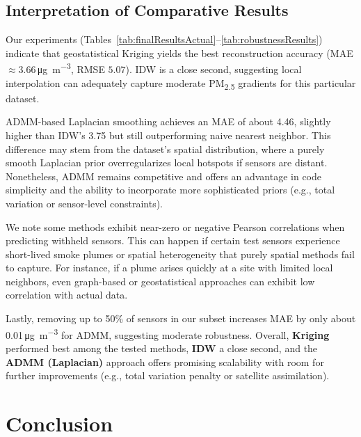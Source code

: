 \documentclass[12pt]{article}                                %
\begin{document}
\subsection{Interpretation of Comparative Results}
\label{sec:discussionInterpretation}   %

Our experiments (Tables~\ref{tab:finalResultsActual}--\ref{tab:robustnessResults}) 
indicate that geostatistical Kriging yields the best reconstruction accuracy (MAE 
$\approx3.66$\,\si{\micro\gram\per\cubic\meter}, RMSE $5.07$). IDW is a close second, 
suggesting local interpolation can adequately capture moderate PM\textsubscript{2.5} 
gradients for this particular dataset.

ADMM-based Laplacian smoothing achieves an MAE of about 4.46, slightly higher than IDW’s 
3.75 but still outperforming naive nearest neighbor. This difference may stem from the 
dataset’s spatial distribution, where a purely smooth Laplacian prior overregularizes local 
hotspots if sensors are distant. Nonetheless, ADMM remains competitive and offers an 
advantage in code simplicity and the ability to incorporate more sophisticated priors 
(e.g., total variation or sensor-level constraints).

We note some methods exhibit near-zero or negative Pearson correlations when predicting 
withheld sensors. This can happen if certain test sensors experience short-lived smoke 
plumes or spatial heterogeneity that purely spatial methods fail to capture. For instance, 
if a plume arises quickly at a site with limited local neighbors, even graph-based or 
geostatistical approaches can exhibit low correlation with actual data.

Lastly, removing up to 50\% of sensors in our subset increases MAE by only about 
0.01\,\si{\micro\gram\per\cubic\meter} for ADMM, suggesting moderate robustness. Overall, 
\textbf{Kriging} performed best among the tested methods, \textbf{IDW} a close second, 
and the \textbf{ADMM (Laplacian)} approach offers promising scalability with room for 
further improvements (e.g., total variation penalty or satellite assimilation).

\section{Conclusion}
\label{sec:conclusion}   %
\end{document}
